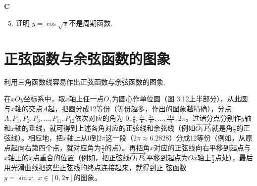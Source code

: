 \begin{center}
    \bfseries C
\end{center}
\begin{enumerate}\setcounter{enumi}{4}
    \item 证明 $y=\cos\sqrt{x}$不是周期函数.
\end{enumerate}

\section{正弦函数与余弦函数的图象}
利用三角函数线容易作出正弦函数与余弦函数的图象.

在$xOy$坐标系中，取$x$轴上任一点$O_1$为圆心作单位圆（图
3.12上半部分），从此圆与$x$轴的交点$A$起，把圆分成12等份（等份越多，作出的图象越精确），分点$A,P_1,P_2,P_3,\ldots, P_{11},P_{12}$依次对应的角为
$0,\frac{\pi}{6},\frac{2\pi}{6},\frac{3\pi}{6},\ldots,\frac{11\pi}{6},2\pi$。过诸分点分别作$y$轴和$x$轴的垂线，就可得到上述各角对应的正弦线和余弦线（例如$\overrightarrow{O_1P_3}$就是角$\frac{\pi}{2}$的正弦线）。相应地，把$x$轴上从0到$2\pi$这一段（$2\pi\approx 6.2828$）分成12等份（例如，从原点起向右第四个点，就对应角为$\frac{\pi}{2}$的点）。再把角$x$对应的正弦线向右平移到起点与$x$轴上的$x$点重合的位置（例如，把正弦线$\overrightarrow{O_1P_3}$平移到起点为$Ox$轴上$\frac{\pi}{2}$点处），最后用光滑曲线把这些正弦线的终点连接起来，就得到正 弦函数$y=\sin x,\; x\in [0,2\pi]$的图象。

